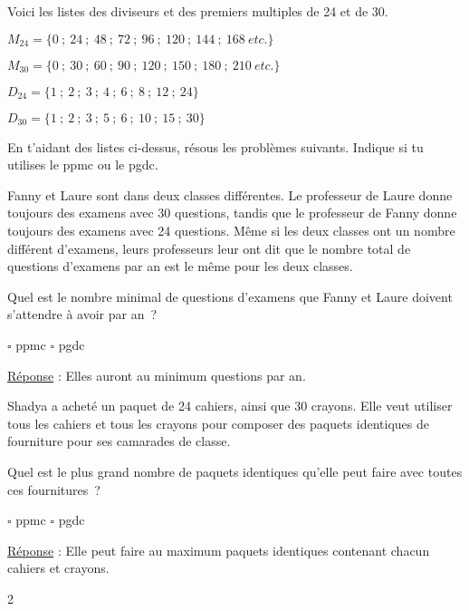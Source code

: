 \documentclass[a4paper,11pt]{report}
\begin{document}
\begin{exo}{
    Voici les listes des diviseurs et des premiers multiples de 24 et de 30. 
    
    \hspace*{1cm} $M_{24}=\{0~;~24~;~48~;~72~;~96~;~120~;~144~;~168~etc.\}$ 

    \hspace*{1cm} $M_{30}=\{0~;~30~;~60~;~90~;~120~;~150~;~180~;~210~etc.\}$

    \hspace*{1cm} $D_{24}=\{1~;~2~;~3~;~4~;~6~;~8~;~12~;~24\}$ 

    \hspace*{1cm} $D_{30}=\{1~;~2~;~3~;~5~;~6~;~10~;~15~;~30\}$ 

    En t'aidant des listes ci-dessus, résous les problèmes suivants. Indique si tu utilises le ppmc ou le pgdc. 
    
    \begin{tasks}
        \task Fanny et Laure sont dans deux classes différentes. Le professeur de Laure donne toujours des examens avec 30 questions, tandis que le professeur de Fanny donne toujours des examens avec 24 questions. Même si les deux classes ont un nombre différent d'examens, leurs professeurs leur ont dit que le nombre total de questions d'examens par an est le même pour les deux classes.

		Quel est le nombre minimal de questions d'examens que Fanny et Laure doivent s'attendre à avoir par an~?
        \begin{center}  $\square$ ppmc \hspace*{2cm} $\square$ pgdc     \end{center}
        \underline{Réponse} : Elles auront au minimum  questions par an.
    
        \task Shadya a acheté un paquet de 24 cahiers, ainsi que 30 crayons. Elle veut utiliser tous les cahiers et tous les crayons pour composer des paquets identiques de fourniture pour ses camarades de classe. 

		Quel est le plus grand nombre de paquets identiques qu'elle peut faire avec toutes ces fournitures~?
        \begin{center}  $\square$ ppmc \hspace*{2cm} $\square$ pgdc     \end{center}
        \underline{Réponse} : Elle peut faire au maximum  paquets identiques contenant chacun  cahiers et  crayons.

    \end{tasks} 
}{2}\end{exo}
\end{document}
